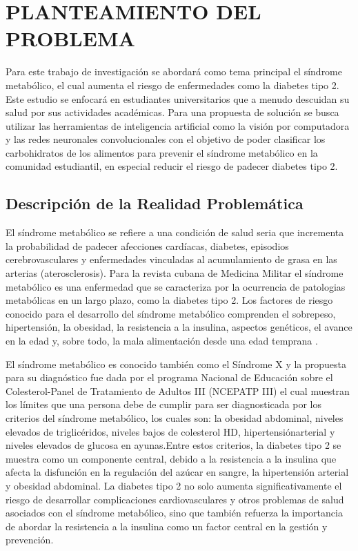 \chapter{PLANTEAMIENTO DEL PROBLEMA}

Para este trabajo de investigación se abordará como tema principal el síndrome metabólico, el cual aumenta el riesgo de enfermedades como la diabetes tipo 2. Este estudio se enfocará en estudiantes universitarios que a menudo descuidan su salud por sus actividades académicas. Para una propuesta de solución se busca utilizar las herramientas de inteligencia artificial como la visión por computadora y las redes neuronales convolucionales con el objetivo de poder clasificar los carbohidratos de los alimentos para prevenir el síndrome metabólico en la comunidad estudiantil, en especial reducir el riesgo de padecer diabetes tipo 2. 

\section{Descripción de la Realidad Problemática}

El síndrome metabólico se refiere a una condición de salud seria que incrementa la probabilidad de padecer afecciones cardíacas, diabetes, episodios cerebrovasculares y enfermedades vinculadas al acumulamiento de grasa en las arterias (aterosclerosis). Para la revista cubana de Medicina Militar \parencite{vera2022combinaciones} el síndrome metabólico es una enfermedad que se caracteriza por la ocurrencia de patologias metabólicas en un largo plazo, como la diabetes tipo 2. Los  factores de riesgo conocido para el desarrollo del síndrome metabólico comprenden el sobrepeso, hipertensión, la obesidad, la resistencia a la insulina, aspectos genéticos, el avance en la edad y, sobre todo, la mala alimentación desde una edad temprana \parencite{lemieux2020metabolic}.

El síndrome metabólico es conocido también como el Síndrome X y la propuesta para su diagnóstico fue dada por el programa Nacional de Educación sobre el Colesterol-Panel de Tratamiento de Adultos III (NCEPATP III) el cual muestran los límites que una persona debe de cumplir para ser diagnosticada por los criterios del síndrome metabólico, los cuales son: la obesidad abdominal, niveles elevados de triglicéridos, niveles bajos de colesterol HD, hipertensiónarterial y niveles elevados de glucosa en ayunas.Entre estos criterios, la diabetes tipo 2 se muestra como un componente central, debido a la resistencia a la insulina que afecta la disfunción en la regulación del azúcar en sangre, la hipertensión arterial y obesidad abdominal. La diabetes tipo 2 no solo aumenta significativamente el riesgo de desarrollar complicaciones cardiovasculares y otros problemas de salud asociados con el síndrome metabólico, sino que también refuerza la importancia de abordar la resistencia a la insulina como un factor central en la gestión y prevención.  

